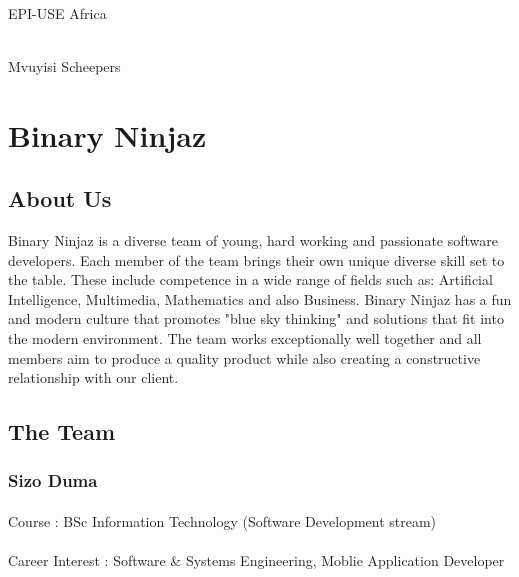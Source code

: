 \documentclass[11pt]{article}
\begin{document}
\begin{titlepage}
\begin{center}
		\begin{minipage}{0.5\textwidth}
			\begin{flushleft} \large
				\emph{} \\
				EPI-USE Africa
			\end{flushleft}
		\end{minipage}
		\begin{minipage}{0.4\textwidth}
			\begin{flushright} \large
				\emph{} \\
				Mvuyisi Scheepers
			\end{flushright}
			\newline
		\end{minipage}
	\end{center}
\end{titlepage}
\tableofcontents


\section{Binary Ninjaz}
\subsection{About Us}
Binary Ninjaz is a diverse team of young, hard working and passionate software developers. Each member of the team brings their own unique diverse skill set to the table. These include competence in a wide range of fields such as: Artificial Intelligence, Multimedia, Mathematics and also Business. Binary Ninjaz has a fun and modern culture that promotes "blue sky thinking" and solutions that fit into the modern environment. The team works exceptionally well together and all members aim to produce a quality product while also creating a constructive relationship with our client.


\subsection{The Team}




\subsubsection{Sizo Duma} 
\paragraph{}Course : BSc Information Technology (Software Development stream)
\paragraph{} Career Interest : Software & Systems Engineering, Moblie Application Developer 
\end{document}
